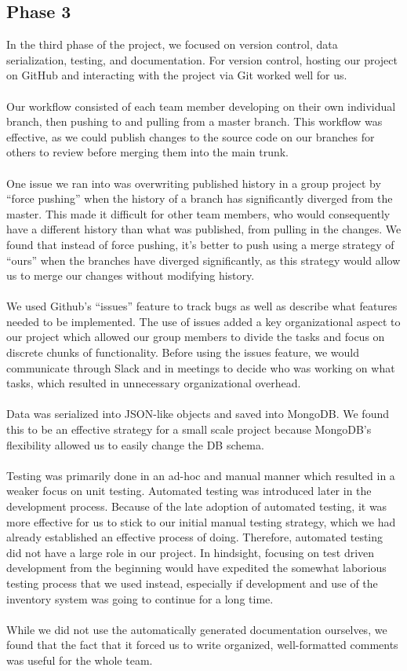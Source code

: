 \documentclass[letterpaper, 12pt]{article}
\begin{document}
\subsection{Phase 3}
\noindent In the third phase of the project, we focused on version control, data serialization, testing, and documentation. For version control, hosting our project on GitHub and interacting with the project via Git worked well for us.
\\\\ Our workflow consisted of each team member developing on their own individual branch, then pushing to and pulling from a master branch.  This workflow was effective, as we could publish changes to the source code on our branches for others to review before merging them into the main trunk. \\\\ One issue we ran into was overwriting published history in a group project by ``force pushing'' when the history of a branch has significantly diverged from the master. This made it difficult for other team members, who would consequently have a different history than what was published, from pulling in the changes. We found that instead of force pushing, it's better to push using a merge strategy of ``ours'' when the branches have diverged significantly, as this strategy would allow us to merge our changes without modifying history. 
\\\\ We used Github's ``issues'' feature to track bugs as well as describe what features needed to be implemented. The use of issues added a key organizational aspect to our project which allowed our group members to divide the tasks and focus on discrete chunks of functionality. Before using the issues feature, we would communicate through Slack and in meetings to decide who was working on what tasks, which resulted in unnecessary organizational overhead.
\\\\ Data was serialized into JSON-like objects and saved into MongoDB. We found this to be an effective strategy for a small scale project because MongoDB's flexibility allowed us to easily change the DB schema.
\\\\ Testing was primarily done in an ad-hoc and manual manner which resulted in a weaker focus on unit testing. Automated testing was introduced later in the development process. Because of the late adoption of automated testing, it was more effective for us to stick to our initial manual testing strategy, which we had already established an effective process of doing. Therefore, automated testing did not have a large role in our project. In hindsight, focusing on test driven development from the beginning would have expedited the somewhat laborious testing process that we used instead, especially if development and use of the inventory system was going to continue for a long time.
 \\\\While we did not use the automatically generated documentation ourselves, we found that the fact that it forced us to write organized, well-formatted comments was useful for the whole team.
\end{document}
